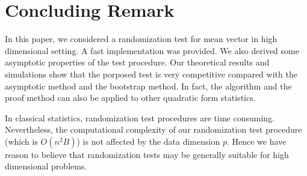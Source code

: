 \documentclass[3p]{elsarticle}
\DeclareMathOperator{\mydiag}{diag}
\newcommand{\BP}{\mathbf{P}}
\theoremstyle{plain}
\theoremstyle{definition}
\theoremstyle{remark}
\begin{document}
%







\section{Concluding Remark}
In this paper, we considered a randomization test for mean vector in high dimensional setting.
A fast implementation was provided.
We also derived some asymptotic properties of the test procedure.
Our theoretical results and simulations show that the porposed test is very competitive compared with the asymptotic method and the bootstrap method.
 In fact, the algorithm and the proof method can also be applied to other quadratic form statistics.

In classical statistics, randomization test procedures are time consuming.
Nevertheless, the computational complexity of our randomization test procedure (which is $O(n^2 B)$) is not affected by the data dimension $p$. 
Hence we have reason to believe that randomization tests may be generally suitable for high dimensional problems.
\end{document}
